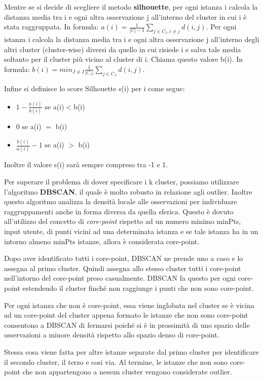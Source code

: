 \documentclass[a4paper]{extarticle}
\begin{document}
Mentre se si decide di scegliere il metodo \textbf{silhouette}, per ogni istanza i calcola la distanza media tra i e ogni altra osservazione j all'interno del cluster in cui i è stata raggruppata. In formula: $a(i) = \frac{1}{|C|-1} \sum_{j \in C_I, i \not = j} d(i,j)$. Per ogni istanza i calcola la distanza media tra i e ogni altra osservazione j all’interno degli altri cluster (cluster-wise) diversi da quello in cui risiede i e salva tale media soltanto per il cluster più vicino al cluster di i. Chiama questo valore b(i). In formula: $b(i) = min_{J \not = I} \frac{1}{|C_J|} \sum_{j\in C_J} d(i,j)$.

Infine si definisce lo score Silhouette s(i) per i come segue:
\begin{itemize}
\item $1 - \frac{a(i)}{b(i)}$ se a(i)$<$b(i)
\item 0 se a(i) $=$ b(i)
\item $\frac{b(i)}{a(i)} - 1$ se a(i) $>$ b(i)
\end{itemize}

Inoltre il valore s(i) sarà sempre compreso tra -1 e 1.

Per superare il problema di dover specificare i k cluster, possiamo utilizzare l'algoritmo \textbf{DBSCAN}, il quale è molto robusto in relazione agli outlier. Inoltre questo algoritmo analizza la densità locale alle osservazioni per individuare raggruppamenti anche in forma diversa da quella sferica. Questo è dovuto all'utilizzo del concetto di \textit{core-point} rispetto ad un numero minimo minPts, input utente, di punti vicini ad una determinata istanza e se tale istanza ha in un intorno almeno minPts istanze, allora è considerata core-point.

Dopo aver identificato tutti i core-point, DBSCAN ne prende uno a caso e lo assegna al primo cluster. Quindi assegna allo stesso cluster tutti i core-point nell'intorno del core-point preso casualmente. DBSCAN fa questo per ogni core-point estendendo il cluster finché non raggiunge i punti che non sono core-point.

Per ogni istanza che non è core-point, essa viene inglobata nel cluster se è vicina ad un core-point del cluster appena formato
le istanze che non sono core-point consentono a DBSCAN di fermarsi poiché si è in prossimità di uno spazio delle osservazioni a minore densità rispetto allo spazio denso di core-point.

Stessa cosa viene fatta per altre istanze separate dal primo cluster per identificare il secondo cluster, il terzo e cosi via. Al termine, le istanze che non sono core-point che non appartengono a nessun cluster vengono considerate outlier.
\end{document}
